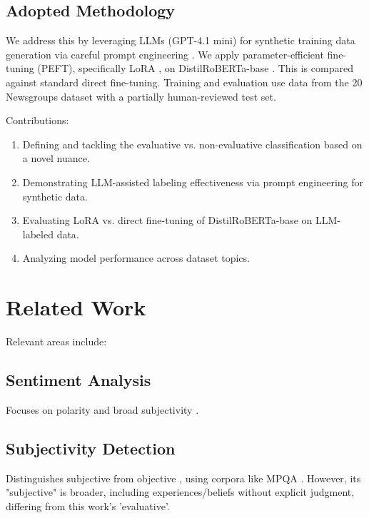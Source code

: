 \documentclass{article}
\begin{document}
\subsection{Adopted Methodology}
\label{sec:methodology_overview}
We address this by leveraging LLMs (GPT-4.1 mini) for synthetic training data generation via careful prompt engineering \citep{tan2024largelanguagemodelsdata}. We apply parameter-efficient fine-tuning (PEFT), specifically LoRA \citep{hu2021LoRAlowrankadaptationlarge}, on DistilRoBERTa-base \citep{sanh2020distilbertdistilledversionbert}. This is compared against standard direct fine-tuning. Training and evaluation use data from the 20 Newsgroups dataset \citep{twenty_newsgroups_113} with a partially human-reviewed test set.

Contributions:
\begin{enumerate}[label=\arabic*., leftmargin=*, noitemsep, topsep=0pt]
\item Defining and tackling the evaluative vs. non-evaluative classification based on a novel nuance.
\item Demonstrating LLM-assisted labeling effectiveness via prompt engineering for synthetic data.
\item Evaluating LoRA vs. direct fine-tuning of DistilRoBERTa-base on LLM-labeled data.
\item Analyzing model performance across dataset topics.
\end{enumerate}

\section{Related Work}
\label{sec:related_work}
Relevant areas include:
\subsection{Sentiment Analysis}
\label{sec:related_work:sentiment}
Focuses on polarity and broad subjectivity \citep{liu2012sentiment}.

\subsection{Subjectivity Detection}
\label{sec:related_work:subjectivity}
Distinguishes subjective from objective \citep{liu2012sentiment}, using corpora like MPQA \citep{wiebe2005annotating}. However, its "subjective" is broader, including experiences/beliefs without explicit judgment, differing from this work's 'evaluative'.
\end{document}
